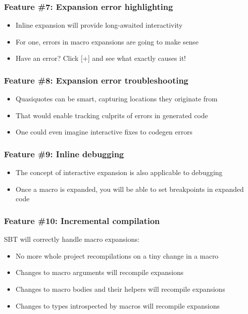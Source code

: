 \documentclass[svgnames,dvipsnames,hyperref={bookmarks=false}]{beamer}
\begin{document}
\begin{frame}[fragile]
\frametitle{Feature \#7: Expansion error highlighting}
\begin{itemize}
\item Inline expansion will provide long-awaited interactivity
\item For one, errors in macro expansions are going to make sense
\item Have an error? Click [+] and see what exactly causes it!
\end{itemize}
\end{frame}

\begin{frame}[fragile]
\frametitle{Feature \#8: Expansion error troubleshooting}
\begin{itemize}
\item Quasiquotes can be smart, capturing locations they originate from
\item That would enable tracking culprits of errors in generated code
\item One could even imagine interactive fixes to codegen errors
\end{itemize}
\end{frame}

\begin{frame}[fragile]
\frametitle{Feature \#9: Inline debugging}
\begin{itemize}
\item The concept of interactive expansion is also applicable to debugging
\item Once a macro is expanded, you will be able to set breakpoints in expanded code
\end{itemize}
\end{frame}

\begin{frame}[fragile]
\frametitle{Feature \#10: Incremental compilation}

SBT will correctly handle macro expansions:
\begin{itemize}
\item No more whole project recompilations on a tiny change in a macro
\item Changes to macro arguments will recompile expansions
\item Changes to macro bodies and their helpers will recompile expansions
\item Changes to types introspected by macros will recompile expansions
\end{itemize}
\end{frame}
\end{document}
